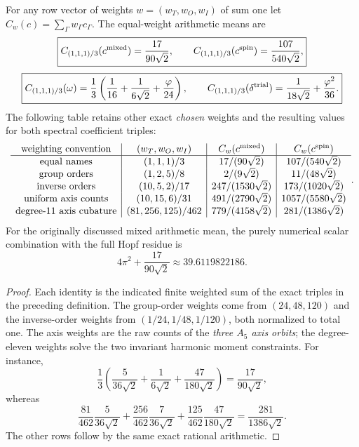 \documentclass[11pt]{article}
\begin{document}
\begin{proposition}
\label{p1b:prop:v11-complete-average-table}
For any row vector of weights $w=(w_T,w_O,w_I)$ of sum one let
$C_w(c)=\sum_\Gamma w_\Gamma c_\Gamma$.  The equal-weight
arithmetic means are
\[
\boxed{C_{(1,1,1)/3}(c^{\rm mixed})=\frac{17}{90\sqrt2},\qquad
 C_{(1,1,1)/3}(c^{\rm spin})=\frac{107}{540\sqrt2},}
\]
\[
\boxed{C_{(1,1,1)/3}(\omega)
 =\frac13\left(\frac1{16}+\frac1{6\sqrt2}+
 \frac\varphi{24}\right),\qquad
 C_{(1,1,1)/3}(\delta^{\rm trial})
 =\frac1{18\sqrt2}+\frac{\varphi^2}{36}.}
\]
The following table retains other exact \emph{chosen} weights and the
resulting values for both spectral coefficient triples:
\[
\begin{array}{c|c|c|c}
\text{weighting convention}&(w_T,w_O,w_I)&
 C_w(c^{\rm mixed})&C_w(c^{\rm spin})\\\hline
\text{equal names}&(1,1,1)/3&17/(90\sqrt2)&107/(540\sqrt2)\\
\text{group orders}&(1,2,5)/8&2/(9\sqrt2)&11/(48\sqrt2)\\
\text{inverse orders}&(10,5,2)/17&247/(1530\sqrt2)&173/(1020\sqrt2)\\
\text{uniform axis counts}&(10,15,6)/31&491/(2790\sqrt2)&1057/(5580\sqrt2)\\
\text{degree-11 axis cubature}&(81,256,125)/462&779/(4158\sqrt2)&281/(1386\sqrt2)
\end{array}.
\]
For the originally discussed mixed arithmetic mean, the purely
numerical scalar combination with the full Hopf residue is
\[
\boxed{4\pi^2+\frac{17}{90\sqrt2}\approx39.6119822186.}
\]
\end{proposition}
\begin{proof}
Each identity is the indicated finite weighted sum of the exact triples
in the preceding definition.  The group-order weights come from
$(24,48,120)$ and the inverse-order weights from
$(1/24,1/48,1/120)$, both normalized to total one.
The axis weights are the raw counts of the \emph{three $A_5$ axis
orbits}; the degree-eleven weights solve the two invariant harmonic
moment constraints.  For instance,
\[
\frac1{3}\left(\frac5{36\sqrt2}+
 \frac1{6\sqrt2}+\frac{47}{180\sqrt2}\right)
 =\frac{17}{90\sqrt2},
\]
whereas
\[
\frac{81}{462}\frac5{36\sqrt2}+
\frac{256}{462}\frac7{36\sqrt2}+
\frac{125}{462}\frac{47}{180\sqrt2}
 =\frac{281}{1386\sqrt2}.
\]
The other rows follow by the same exact rational arithmetic.
\end{proof}
\end{document}
